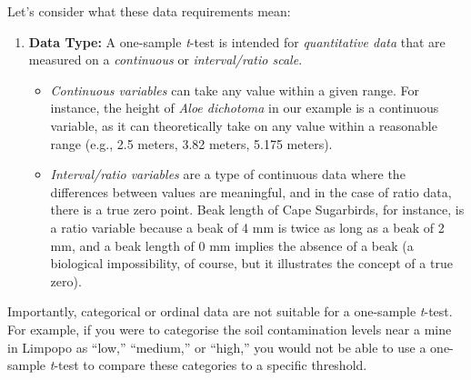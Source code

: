 \documentclass[
  letterpaper,
]{book}
\providecommand{\tightlist}{%
  \setlength{\itemsep}{0pt}\setlength{\parskip}{0pt}}\usepackage{longtable,booktabs,array}
\begin{document}
Let's consider what these data requirements mean:

\vspace{6pt}

\begin{enumerate}
\def\labelenumi{\arabic{enumi}.}
\item
  \textbf{Data Type:} A one-sample \emph{t}-test is intended for
  \emph{quantitative data} that are measured on a \emph{continuous} or
  \emph{interval/ratio scale}.

  \begin{itemize}
  \tightlist
  \item
    \emph{Continuous variables} can take any value within a given range.
    For instance, the height of \emph{Aloe dichotoma} in our example is
    a continuous variable, as it can theoretically take on any value
    within a reasonable range (e.g., 2.5 meters, 3.82 meters, 5.175
    meters).
  \item
    \emph{Interval/ratio variables} are a type of continuous data where
    the differences between values are meaningful, and in the case of
    ratio data, there is a true zero point. Beak length of Cape
    Sugarbirds, for instance, is a ratio variable because a beak of 4 mm
    is twice as long as a beak of 2 mm, and a beak length of 0 mm
    implies the absence of a beak (a biological impossibility, of
    course, but it illustrates the concept of a true zero).
  \end{itemize}
\end{enumerate}

Importantly, categorical or ordinal data are not suitable for a
one-sample \emph{t}-test. For example, if you were to categorise the
soil contamination levels near a mine in Limpopo as ``low,'' ``medium,''
or ``high,'' you would not be able to use a one-sample \emph{t}-test to
compare these categories to a specific threshold.
\end{document}
